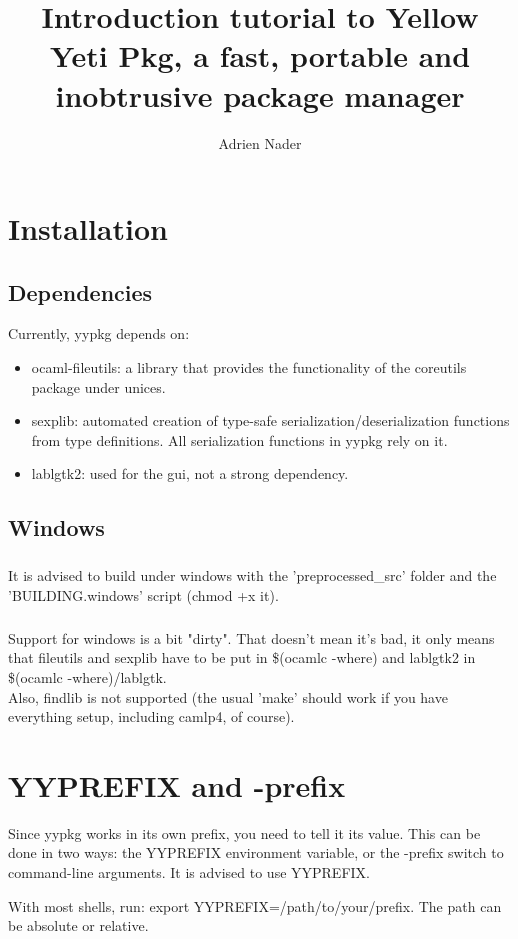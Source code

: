 \documentclass[a4paper]{article}
\author{Adrien Nader}
\title{Introduction tutorial to Yellow Yeti Pkg, a fast, portable and inobtrusive package manager}
\begin{document}
\maketitle

\tableofcontents
\section{Installation}
\subsection{Dependencies}
Currently, yypkg depends on:
\begin{itemize}
  \setlength{\parskip}{0em}
  \item{ocaml-fileutils}: a library that provides the functionality of the coreutils package under unices.
  \item{sexplib}: automated creation of type-safe serialization/deserialization functions from type definitions. All serialization functions in yypkg rely on it.
  \item{lablgtk2}: used for the gui, not a strong dependency.
\end{itemize}

\subsection{Windows}
\subparagraph{} It is advised to build under windows with the 'preprocessed\_src' folder and the 'BUILDING.windows' script (chmod +x it).

\subparagraph{} Support for windows is a bit "dirty". That doesn't mean it's bad, it only means that fileutils and sexplib have to be put in \$(ocamlc -where) and lablgtk2 in \$(ocamlc -where)/lablgtk.\\
Also, findlib is not supported (the usual 'make' should work if you have everything setup, including camlp4, of course).

\section{YYPREFIX and -prefix}
Since yypkg works in its own prefix, you need to tell it its value. This can be done in two ways: the YYPREFIX environment variable, or the -prefix switch to command-line arguments. It is advised to use YYPREFIX.

With most shells, run: export YYPREFIX=/path/to/your/prefix. The path can be absolute or relative.
\end{document}
